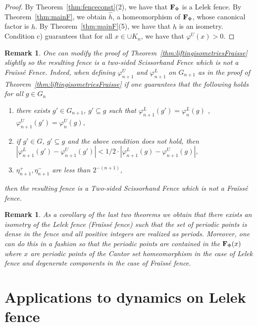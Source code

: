 \documentclass[11pt]{amsart}
\newtheorem{remark}[theorem]{Remark}
\newcommand{\fence}{{\bf F}_{\Phi}{}}
\begin{document}
{\begin{proof}
 By Theorem~\ref{thm:fenceconst}(2), we have that $\fence$ is a Lelek fence. By Theorem~\ref{thm:mainF}, we obtain $\hat{h}$, a homeomorphism of $\fence$, whose canonical factor is $h$. By Theorem~\ref{thm:mainF}(5), we have that $\hat{h}$ is an isometry. Condition c) guarantees that for all $x \in \cup K_n$, we have that $\varphi^U (x)>0$.

\end{proof}
\begin{remark}\label{rmk:isoTwosidedScissor} One can modify the proof of Theorem~\ref{thm:liftingisometriesFraisse} slightly so the resulting fence is a two-sided Scissorhand Fence which is not a Fra\"iss\'e Fence. Indeed, when defining $\varphi_{n+1}^U$ and $\varphi_{n+1}^L$ on $G_{n+1}$ as in the proof of Theorem~\ref{thm:liftingisometriesFraisse} if one guarantees that 
the following holds for all $g \in G_{n}$
\begin{enumerate}

    \item there exists $g' \in G_{n+1}$, $g' \subseteq g$ such that $\varphi_{n+1}^L(g') = \varphi_{n}^ L(g)$ , $\varphi_{n+1}^U(g') = \varphi_{n}^U(g)$, 
    \item if $g' \in G$, $g' \subseteq g$ and the above condition does not hold, then $|\varphi_{n+1}^L(g') -\varphi_{n+1}^U(g')| < 1/2 \cdot |\varphi_{n+1}^L(g) -\varphi_{n+1}^U(g)|$,
    \item $\eta^+_{n+1}, \eta^-_{n+1}$ are less than $2^{-(n+1)}$,
\end{enumerate}
 then the resulting fence is a Two-sided Scissorhand Fence which is not a Fra\"iss\'e fence. 
    
\end{remark}


\begin{remark}\label{rem:isometries}
As a corollary of the last two theorems we obtain that there exists an isometry of the Lelek fence (Fra\"iss\'e fence) such that the set of periodic points is dense in the fence and all positive integers are realized as periods. Moreover, one can do this in a fashion so that the periodic points are contained in the $\fence(x)$ where $x$ are periodic points of the Cantor set homeomorphism in the case of Lelek fence and degenerate components in the case of Fra\"iss\'e fence.
\end{remark}



\section{Applications to dynamics on Lelek fence}\label{sec: Applications to dynamics on Lelek fence}

}
\end{document}

